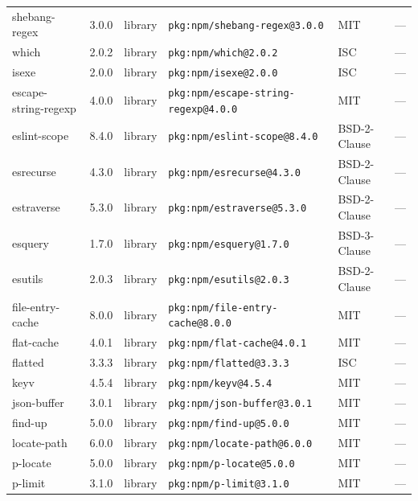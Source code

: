\documentclass[11pt,a4paper]{article}
\begin{document}
\begin{longtable}{|p{4cm}|p{2cm}|p{1.6cm}|p{5cm}|p{1.5cm}|p{3.5cm}|}
\raggedright shebang-regex & 3.0.0 & library & \small\texttt{pkg:npm/shebang-regex@3.0.0} & MIT & \small — \\
\raggedright which & 2.0.2 & library & \small\texttt{pkg:npm/which@2.0.2} & ISC & \small — \\
\raggedright isexe & 2.0.0 & library & \small\texttt{pkg:npm/isexe@2.0.0} & ISC & \small — \\
\raggedright escape-string-regexp & 4.0.0 & library & \small\texttt{pkg:npm/escape-string-regexp@4.0.0} & MIT & \small — \\
\raggedright eslint-scope & 8.4.0 & library & \small\texttt{pkg:npm/eslint-scope@8.4.0} & BSD-2-Clause & \small — \\
\raggedright esrecurse & 4.3.0 & library & \small\texttt{pkg:npm/esrecurse@4.3.0} & BSD-2-Clause & \small — \\
\raggedright estraverse & 5.3.0 & library & \small\texttt{pkg:npm/estraverse@5.3.0} & BSD-2-Clause & \small — \\
\raggedright esquery & 1.7.0 & library & \small\texttt{pkg:npm/esquery@1.7.0} & BSD-3-Clause & \small — \\
\raggedright esutils & 2.0.3 & library & \small\texttt{pkg:npm/esutils@2.0.3} & BSD-2-Clause & \small — \\
\raggedright file-entry-cache & 8.0.0 & library & \small\texttt{pkg:npm/file-entry-cache@8.0.0} & MIT & \small — \\
\raggedright flat-cache & 4.0.1 & library & \small\texttt{pkg:npm/flat-cache@4.0.1} & MIT & \small — \\
\raggedright flatted & 3.3.3 & library & \small\texttt{pkg:npm/flatted@3.3.3} & ISC & \small — \\
\raggedright keyv & 4.5.4 & library & \small\texttt{pkg:npm/keyv@4.5.4} & MIT & \small — \\
\raggedright json-buffer & 3.0.1 & library & \small\texttt{pkg:npm/json-buffer@3.0.1} & MIT & \small — \\
\raggedright find-up & 5.0.0 & library & \small\texttt{pkg:npm/find-up@5.0.0} & MIT & \small — \\
\raggedright locate-path & 6.0.0 & library & \small\texttt{pkg:npm/locate-path@6.0.0} & MIT & \small — \\
\raggedright p-locate & 5.0.0 & library & \small\texttt{pkg:npm/p-locate@5.0.0} & MIT & \small — \\
\raggedright p-limit & 3.1.0 & library & \small\texttt{pkg:npm/p-limit@3.1.0} & MIT & \small — \\

\end{longtable}
\end{document}
